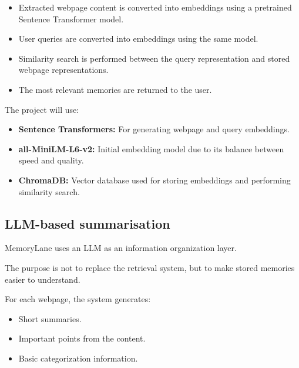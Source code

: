 \documentclass[11pt,a4paper]{article}
\begin{document}
\begin{itemize}[leftmargin=0.7cm]

\item Extracted webpage content is converted into embeddings using a pretrained Sentence Transformer model.

\item User queries are converted into embeddings using the same model.

\item Similarity search is performed between the query representation and stored webpage representations.

\item The most relevant memories are returned to the user.

\end{itemize}


The project will use:

\begin{itemize}[leftmargin=0.7cm]

\item \textbf{Sentence Transformers:} For generating webpage and query embeddings.

\item \textbf{all-MiniLM-L6-v2:} Initial embedding model due to its balance between speed and quality.

\item \textbf{ChromaDB:} Vector database used for storing embeddings and performing similarity search.

\end{itemize}


\subsection{LLM-based summarisation}

MemoryLane uses an LLM as an information organization layer.

The purpose is not to replace the retrieval system, but to make stored memories easier to understand.

For each webpage, the system generates:

\begin{itemize}[leftmargin=0.7cm]

\item Short summaries.

\item Important points from the content.

\item Basic categorization information.

\end{itemize}
\end{document}
